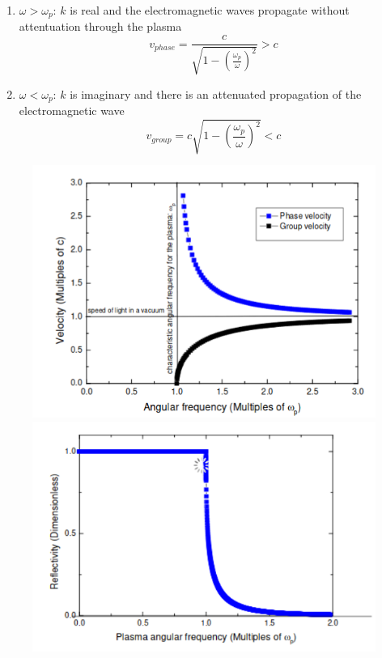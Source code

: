 \documentclass[a4paper, 11pt, normalem]{report}
\begin{document}
\begin{itemize}
\begin{enumerate}
            \item $\omega > \omega_p$: $k$ is real and the electromagnetic waves propagate without attentuation through the plasma
                \begin{equation}
                    v_{phase} = \frac{c}{\sqrt{1 - \left(\frac{\omega_p}{\omega}\right)^2}} > c
                \end{equation}
            \item $\omega < \omega_p$: $k$ is imaginary and there is an attenuated propagation of the electromagnetic wave
                \begin{equation}
                    v_{group} = c\sqrt{1 - \left(\frac{\omega_p}{\omega}\right)^2} < c
                \end{equation}
        \end{enumerate}
\end{itemize}
\begin{figure}[H]
	\centering
	\includegraphics[scale=0.4]{phasegroup.png}
	\includegraphics[scale=0.4]{plasma.png}
\end{figure}
\end{document}
